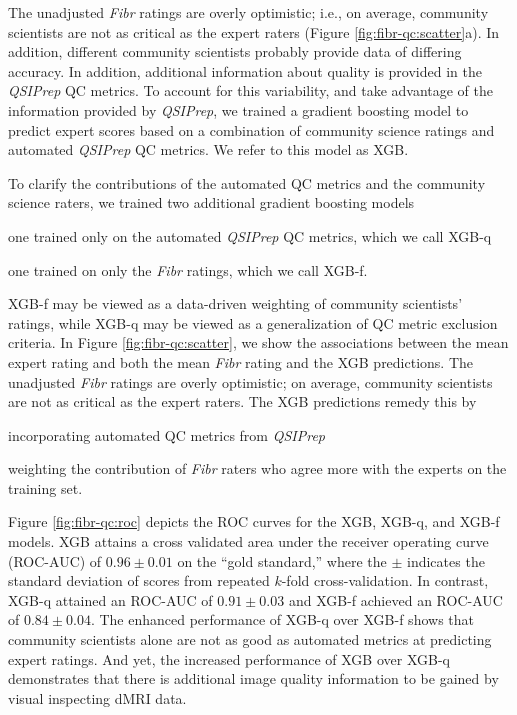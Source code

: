 \documentclass[fleqn,10pt]{wlscirep}
\begin{document}
The unadjusted \emph{Fibr} ratings are overly optimistic; i.e., on average,
community scientists are not as critical as the expert raters (Figure
\ref{fig:fibr-qc:scatter}a). In addition, different community scientists
probably provide data of differing accuracy. In addition, additional information
about quality is provided in the \emph{QSIPrep} QC metrics. To account for this
variability, and take advantage of the information provided by \emph{QSIPrep},
we trained a gradient boosting model \cite{chen2016-eb} to predict expert scores
based on a combination of community science ratings and automated \emph{QSIPrep}
QC metrics. We refer to this model as XGB.

To clarify the contributions of the automated QC metrics and the community
science raters, we trained two additional gradient boosting models
\begin{enumerate*}[%
    label=(\roman*),%
    before=\unskip{: },%
    itemjoin={{, }},%
    itemjoin*={{ and }}]
    \item one trained only on the automated \emph{QSIPrep} QC metrics, which we
    call XGB-q
    \item one trained on only the \emph{Fibr} ratings, which we call XGB-f.
\end{enumerate*}
XGB-f may be viewed as a data-driven weighting of community scientists' ratings,
while XGB-q may be viewed as a generalization of QC metric exclusion criteria.
In Figure \ref{fig:fibr-qc:scatter}, we show the associations between the mean
expert rating and both the mean \emph{Fibr} rating and the XGB predictions. The
unadjusted \emph{Fibr} ratings are overly optimistic; on average, community
scientists are not as critical as the expert raters. The XGB predictions remedy
this by
\begin{enumerate*}[%
    label=(\roman*),%
    before={{ }},%
    itemjoin={{, }},%
    itemjoin*={{ and }}]
    \item incorporating automated QC metrics from \emph{QSIPrep}
    \item weighting the contribution of \emph{Fibr} raters who agree more with
    the experts on the training set.
\end{enumerate*}
Figure \ref{fig:fibr-qc:roc} depicts the ROC curves for the XGB, XGB-q, and
XGB-f models.
XGB attains a cross validated area under the receiver operating curve (ROC-AUC) of
$0.96 \pm 0.01$ on the ``gold standard,'' where the $\pm$ indicates the standard
deviation of scores from repeated $k$-fold cross-validation.
In contrast, XGB-q attained an ROC-AUC of $0.91 \pm 0.03$ and XGB-f achieved an
ROC-AUC of $0.84 \pm 0.04$.
The enhanced performance of XGB-q over XGB-f shows that community scientists
alone are not as good as automated metrics at predicting expert ratings. And
yet, the increased performance of XGB over XGB-q demonstrates that there is
additional image quality information to be gained by visual inspecting dMRI
data.
\end{document}
